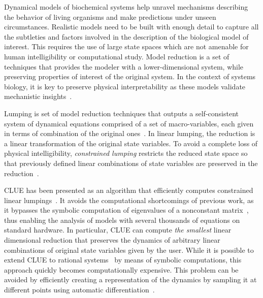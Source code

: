 
Dynamical models of biochemical systems help unravel mechanisms describing the behavior of living organisms and make predictions under unseen circumstances.
Realistic models need to be built with enough detail to capture all the subtleties and factors involved in the description of the biological model of interest.
This requires the use of large state spaces which are not amenable for human intelligibility or computational study.
Model reduction is a set of techniques that provides the modeler with a lower-dimensional system, while preserving properties of interest of the original system.
In the context of systems biology, it is key to preserve physical interpretability as these models validate mechanistic insights~\cite{10.1093/bioinformatics/btn035,21899762,Apri201216}.


Lumping is set of model reduction techniques that outputs a self-consistent system of dynamical equations comprised of a set of macro-variables, each given in terms of combination of the original ones~\cite{okino1998,Snowden:2017aa,DBLP:conf/qest/GrossmannKBW18,backenkohler2021abstraction,DBLP:journals/pe/AbateACK21}.
In linear lumping, the reduction is a linear transformation of the original state variables.
To avoid a complete loss of physical intelligibility,  
\emph{constrained lumping} restricts the reduced state space so that  previously defined linear combinations of state variables are preserved in the reduction~\cite{LI199195}.

CLUE has been presented as an algorithm that efficiently computes constrained linear lumpings~\cite{ovchinnikov_clue_2021}.
It avoids the computational shortcomings of previous work, as it bypasses the symbolic computation of eigenvalues of a nonconstant matrix~\cite{LiRabitz,LI199195}, thus enabling the analysis of models with several thousands of equations on standard hardware.
In particular, CLUE can compute \emph{the smallest} linear dimensional reduction that preserves the dynamics of arbitrary linear combinations of original state variables given by the user.
While it is possible to extend CLUE to rational systems~\cite{jimenez_clue_2022} by means of symbolic computations, this approach quickly becomes computationally expensive.
This problem can be avoided by efficiently creating a representation of the dynamics by sampling it at different points using automatic differentiation~\cite{jimenez_clue_2022}.


